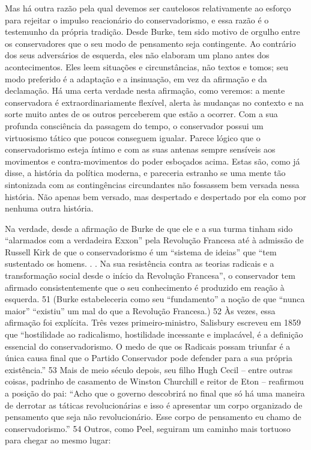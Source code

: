 Mas há outra razão pela qual devemos ser cautelosos relativamente ao esforço para rejeitar o impulso reacionário do conservadorismo, e essa razão é o testemunho da própria tradição. Desde Burke, tem sido motivo de orgulho entre os conservadores que o seu modo de pensamento seja contingente. Ao contrário dos seus adversários de esquerda, eles não elaboram um plano antes dos acontecimentos. Eles leem situações e circunstâncias, não textos e tomos; seu modo preferido é a adaptação e a insinuação, em vez da afirmação e da declamação. Há uma certa verdade nesta afirmação, como veremos: a mente conservadora é extraordinariamente flexível, alerta às mudanças no contexto e na sorte muito antes de os outros perceberem que estão a ocorrer. Com a sua profunda consciência da passagem do tempo, o conservador possui um virtuosismo tático que poucos conseguem igualar. Parece lógico que o conservadorismo esteja íntimo e com as suas antenas sempre sensíveis aos movimentos e contra-movimentos do poder esboçados acima. Estas são, como já disse, a história da política moderna, e pareceria estranho se uma mente tão sintonizada com as contingências circundantes não fossassem bem versada nessa história. Não apenas bem versado, mas despertado e despertado por ela como por nenhuma outra história.
 
\par
 
Na verdade, desde a afirmação de Burke de que ele e a sua turma tinham sido “alarmados com a verdadeira Exxon” pela Revolução Francesa até à admissão de Russell Kirk de que o conservadorismo é um “sistema de ideias” que “tem sustentado os homens. . . Na sua resistência contra as teorias radicais e a transformação social desde o início da Revolução Francesa”, o conservador tem afirmado consistentemente que o seu conhecimento é produzido em reação à esquerda.
 {\color{blue} 51}  
(Burke estabeleceria como seu “fundamento” a noção de que “nunca maior” “existiu” um mal do que a Revolução Francesa.)
 {\color{blue} 52}  
Às vezes, essa afirmação foi explícita. Três vezes primeiro-ministro, Salisbury escreveu em 1859 que “hostilidade ao radicalismo, hostilidade incessante e implacável, é a definição essencial do conservadorismo. O medo de que os Radicais possam triunfar é a única causa final que o Partido Conservador pode defender para a sua própria existência.”
 {\color{blue} 53}  
Mais de meio século depois, seu filho Hugh Cecil – entre outras coisas, padrinho de casamento de Winston Churchill e reitor de Eton – reafirmou a posição do pai: “Acho que o governo descobrirá no final que só há uma maneira de derrotar as táticas revolucionárias e isso é apresentar um corpo organizado de pensamento que seja não revolucionário. Esse corpo de pensamento eu chamo de conservadorismo.”
 {\color{blue} 54}  
Outros, como Peel, seguiram um caminho mais tortuoso para chegar ao mesmo lugar:
 

